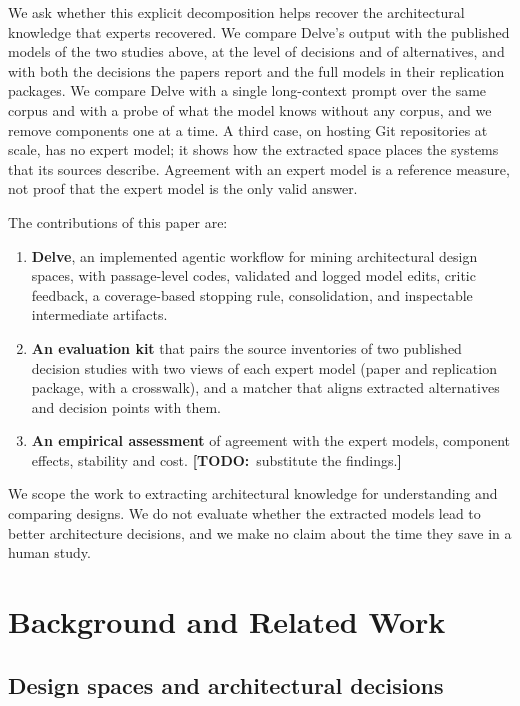 \documentclass[conference]{IEEEtran}
\providecommand{\tightlist}{\setlength{\itemsep}{0pt}\setlength{\parskip}{0pt}}
\newcommand{\todo}[1]{{\color{red}\textbf{[TODO:}~#1\textbf{]}}}
\begin{document}
We ask whether this explicit decomposition helps recover the architectural knowledge that experts recovered. We compare Delve's output with the published models of the two studies above, at the level of decisions and of alternatives, and with both the decisions the papers report and the full models in their replication packages. We compare Delve with a single long-context prompt over the same corpus and with a probe of what the model knows without any corpus, and we remove components one at a time. A third case, on hosting Git repositories at scale, has no expert model; it shows how the extracted space places the systems that its sources describe. Agreement with an expert model is a reference measure, not proof that the expert model is the only valid answer.

The contributions of this paper are:

\begin{enumerate}
\def\labelenumi{\arabic{enumi}.}
\tightlist
\item
  \textbf{Delve}, an implemented agentic workflow for mining architectural design spaces, with passage-level codes, validated and logged model edits, critic feedback, a coverage-based stopping rule, consolidation, and inspectable intermediate artifacts.
\item
  \textbf{An evaluation kit} that pairs the source inventories of two published decision studies with two views of each expert model (paper and replication package, with a crosswalk), and a matcher that aligns extracted alternatives and decision points with them.
\item
  \textbf{An empirical assessment} of agreement with the expert models, component effects, stability and cost. \todo{substitute the findings.}
\end{enumerate}

We scope the work to extracting architectural knowledge for understanding and comparing designs. We do not evaluate whether the extracted models lead to better architecture decisions, and we make no claim about the time they save in a human study.

\section{Background and Related Work}

\subsection{Design spaces and architectural decisions}
\end{document}
